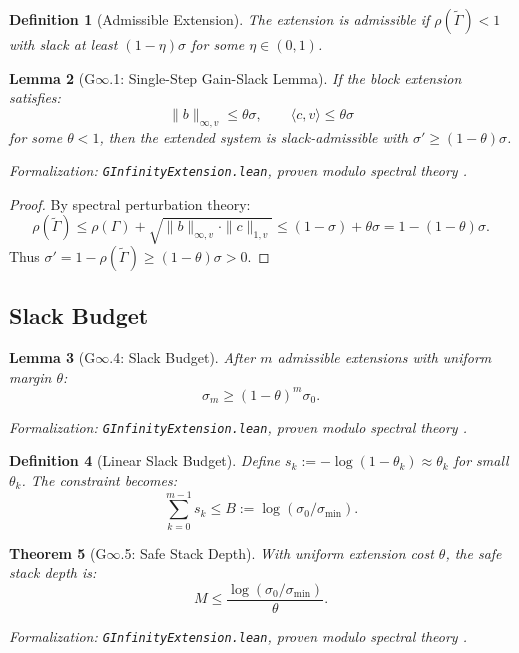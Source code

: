 \documentclass[12pt]{article}
\newtheorem{theorem}{Theorem}[section]
\newtheorem{lemma}[theorem]{Lemma}
\newtheorem{definition}[theorem]{Definition}
\begin{document}
\begin{definition}[Admissible Extension]
The extension is \emph{admissible} if $\rho(\tilde{\Gamma}) < 1$ with slack at least $(1 - \eta)\sigma$ for some $\eta \in (0, 1)$.
\end{definition}

\begin{lemma}[G$\infty$.1: Single-Step Gain-Slack Lemma]
\label{lem:single-step}
If the block extension satisfies:
\[
\|b\|_{\infty, v} \leq \theta \sigma, \qquad \langle c, v \rangle \leq \theta \sigma
\]
for some $\theta < 1$, then the extended system is slack-admissible with $\sigma' \geq (1 - \theta)\sigma$.
\end{lemma}
\noindent\textit{Formalization: \texttt{GInfinityExtension.lean}, proven modulo spectral theory \citep{horn2012matrix}.}

\begin{proof}
By spectral perturbation theory:
\[
\rho(\tilde{\Gamma}) \leq \rho(\Gamma) + \sqrt{\|b\|_{\infty, v} \cdot \|c\|_{1, v}} \leq (1 - \sigma) + \theta \sigma = 1 - (1 - \theta)\sigma.
\]
Thus $\sigma' = 1 - \rho(\tilde{\Gamma}) \geq (1 - \theta)\sigma > 0$.
\end{proof}

\subsection{Slack Budget}

\begin{lemma}[G$\infty$.4: Slack Budget]
\label{lem:slack-budget}
After $m$ admissible extensions with uniform margin $\theta$:
\[
\sigma_m \geq (1 - \theta)^m \sigma_0.
\]
\end{lemma}
\noindent\textit{Formalization: \texttt{GInfinityExtension.lean}, proven modulo spectral theory \citep{horn2012matrix}.}

\begin{definition}[Linear Slack Budget]
Define $s_k := -\log(1 - \theta_k) \approx \theta_k$ for small $\theta_k$. The constraint becomes:
\[
\sum_{k=0}^{m-1} s_k \leq B := \log(\sigma_0 / \sigma_{\min}).
\]
\end{definition}

\begin{theorem}[G$\infty$.5: Safe Stack Depth]
\label{thm:safe-depth}
With uniform extension cost $\theta$, the safe stack depth is:
\[
M \leq \frac{\log(\sigma_0 / \sigma_{\min})}{\theta}.
\]
\end{theorem}
\noindent\textit{Formalization: \texttt{GInfinityExtension.lean}, proven modulo spectral theory \citep{horn2012matrix}.}
\end{document}
